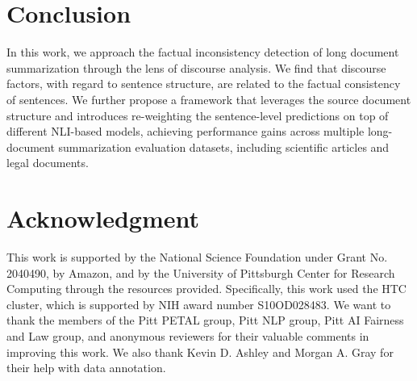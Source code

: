 \section{Conclusion}
In this work, we approach the factual inconsistency detection of long document summarization through the lens of discourse analysis. We find that discourse factors, with regard to sentence structure, are related to the factual consistency of sentences. We further propose a framework that leverages the source document structure and introduces re-weighting the sentence-level predictions on top of different NLI-based models, achieving performance gains across multiple long-document summarization evaluation datasets, including scientific articles and legal documents.

\section*{Acknowledgment}
This work is supported by the National Science
Foundation under Grant No. 2040490, by Amazon, and by the
  University of Pittsburgh Center for Research Computing through the resources
 provided. Specifically, this work used the HTC cluster, which is supported by NIH award number S10OD028483. We want to
thank the members of the Pitt PETAL group, Pitt
NLP group, Pitt AI Fairness and Law group, and anonymous reviewers for their
valuable comments in improving this work. We also thank Kevin D. Ashley and Morgan A. Gray for their help with data annotation. 
